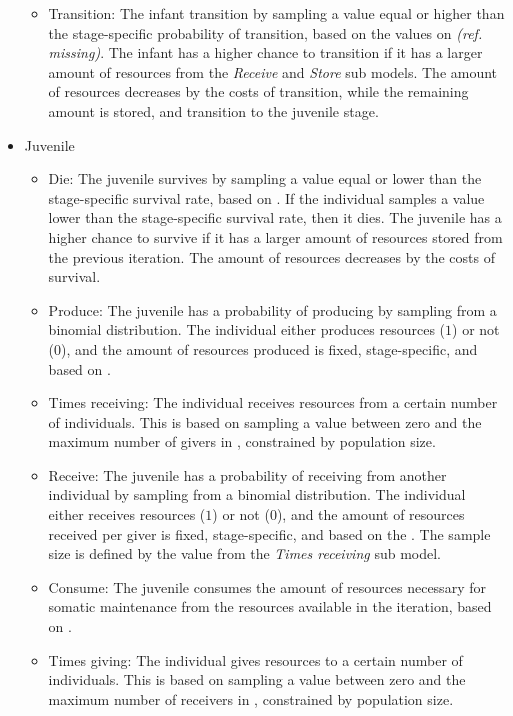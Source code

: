 \documentclass{article}
\begin{document}
\begin{itemize}
\begin{itemize}
        \item Transition: The infant transition by sampling a value equal or higher than the stage-specific probability of transition, based on the values on \emph{(ref. missing)}. The infant has a higher chance to transition if it has a larger amount of resources from the \emph{Receive} and \emph{Store} sub models. The amount of resources decreases by the costs of transition, while the remaining amount is stored, and transition to the juvenile stage.
    \end{itemize}
    \item Juvenile
    \begin{itemize}
        \item Die: The juvenile survives by sampling a value equal or lower than the stage-specific survival rate, based on \cite{gurven2007longevity}. If the individual samples a value lower than the stage-specific survival rate, then it dies. The juvenile has a higher chance to survive if it has a larger amount of resources stored from the previous iteration. The amount of resources decreases by the costs of survival.
        \item Produce: The juvenile has a probability of producing by sampling from a binomial distribution. The individual either produces resources ($1$) or not ($0$), and the amount of resources produced is fixed, stage-specific, and based on \cite{koster2020life}.
        \item Times receiving: The individual receives resources from a certain number of individuals. This is based on sampling a value between zero and the maximum number of givers in \cite{gurven2004give}, constrained by population size.
        \item Receive: The juvenile has a probability of receiving from another individual by sampling from a binomial distribution. The individual either receives resources ($1$) or not ($0$), and the amount of resources received per giver is fixed, stage-specific, and based on the \cite{gurven2004give}. The sample size is defined by the value from the \emph{Times receiving} sub model. 
        \item Consume: The juvenile consumes the amount of resources necessary for somatic maintenance from the resources available in the iteration, based on \cite{kaplan2000theory,pontzer2021daily}.
        \item Times giving: The individual gives resources to a certain number of individuals. This is based on sampling a value between zero and the maximum number of receivers in \cite{gurven2004give}, constrained by population size.

\end{itemize}
\end{itemize}
\end{document}
